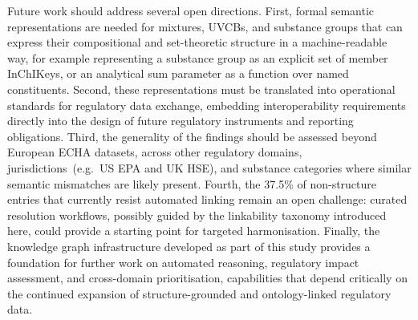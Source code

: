 Future work should address several open directions. First, formal semantic representations are needed for mixtures, UVCBs, and substance groups that can express their compositional and set-theoretic structure in a machine-readable way, for example representing a substance group as an explicit set of member InChIKeys, or an analytical sum parameter as a function over named constituents. Second, these representations must be translated into operational standards for regulatory data exchange, embedding interoperability requirements directly into the design of future regulatory instruments and reporting obligations. Third, the generality of the findings should be assessed beyond European ECHA datasets, across other regulatory domains, jurisdictions~(e.g.~US EPA and UK HSE), and substance categories where similar semantic mismatches are likely present. Fourth, the 37.5\% of non-structure entries that currently resist automated linking remain an open challenge: curated resolution workflows, possibly guided by the linkability taxonomy introduced here, could provide a starting point for targeted harmonisation. Finally, the knowledge graph infrastructure developed as part of this study provides a foundation for further work on automated reasoning, regulatory impact assessment, and cross-domain prioritisation, capabilities that depend critically on the continued expansion of structure-grounded and ontology-linked regulatory data.